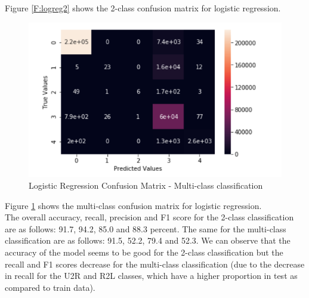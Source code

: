 Figure \ref{F:logreg2} shows the 2-class confusion matrix for logistic regression.
\begin{figure}
	\includegraphics[width=1.0\columnwidth]{images/logregall.PNG}
	\caption{Logistic Regression Confusion Matrix - Multi-class classification}
	\label{F:logregall}
\end{figure}
Figure \ref{F:logregall} shows the multi-class confusion matrix for logistic regression.\\
The overall accuracy, recall, precision and F1 score for the 2-class classification are as follows: 91.7, 94.2, 85.0 and 88.3 percent. The same for the multi-class classification are as follows: 91.5, 52.2, 79.4 and
52.3. We can observe that the accuracy of the model seems to be good for the 2-class classification but the recall and F1 scores decrease for the multi-class classification (due to the decrease in recall for the U2R and R2L classes, which have a higher proportion in test as compared to train data).

